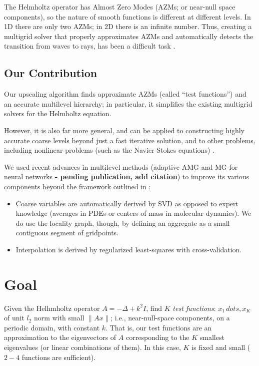 \documentclass{article}
\begin{document}
The Helmholtz operator has Almost Zero Modes (AZMs; or near-null space components), so the nature of smooth functions is different at different levels. In 1D there are only two AZMs; in 2D there is an infinite number. Thus, creating a multigrid solver that properly approximates AZMs and automatically detects the transition from waves to rays, has been a difficult task \cite{wave_ray}.

\subsection{Our Contribution}
Our upscaling algorithm finds approximate AZMs (called ``test functions'') and an accurate multilevel hierarchy; in particular, it simplifies the existing multigrid solvers for the Helmholtz equation.

However, it is also far more general, and can be applied to constructing highly accurate coarse levels beyond just a fast iterative solution, and to other problems, including nonlinear problems (such as the Navier Stokes equations) .

We used recent advances in multilevel methods (adaptive AMG \cite{bamg, lamg, mg_guide} and MG for neural networks \textbf{- pending publication, add citation}) to improve its various components beyond the framework outlined in \cite{su}:
\begin{itemize}
	\item Coarse variables are automatically derived by SVD as opposed to expert knowledge (averages in PDEs or centers of mass in molecular dynamics). We do use the locality graph, though, by defining an aggregate as a small contiguous segment of gridpoints.
	\item Interpolation is derived by regularized least-squares with cross-validation.
\end{itemize}

\section{Goal}
Given the Helhmholtz operator $A = -\Delta + k^2 I$, find $K$ \emph{test functions}: $x_1\,dots,x_K$ of unit $l_2$ norm with small $\|A x\|$; i.e., near-null-space components, on a periodic domain, with constant $k$. That is, our test functions are an approximation to the eigenvectors of $A$ corresponding to the $K$ smallest eigenvalues (or linear combinations of them). In this case, $K$ is fixed and small ($2-4$ functions are sufficient).
\end{document}
